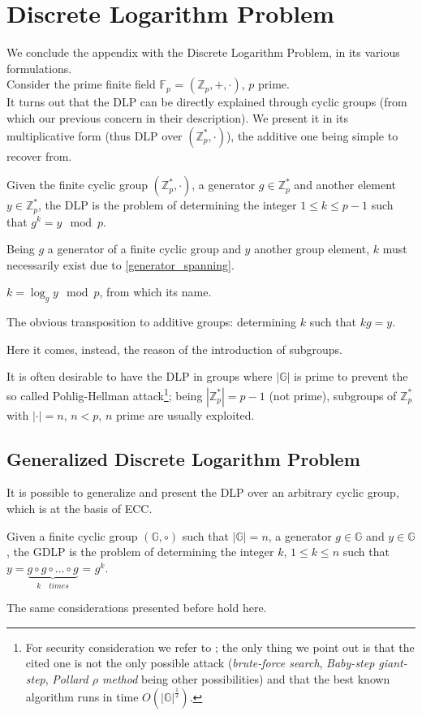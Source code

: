 \section{Discrete Logarithm Problem}
\label{DLP}
We conclude the appendix with the Discrete Logarithm Problem, in its various formulations.\\
Consider the prime finite field $\mathbb{F}_p$ = $(\mathbb{Z}_p,+,\cdot)$, $p$ prime.\\
It turns out that the DLP can be directly explained through cyclic groups (from which our previous concern in their description). We present it in its multiplicative form (thus DLP over $(\mathbb{Z}_p^{*},\cdot)$), the additive one being simple to recover from.
\begin{mydef}
    Given the finite cyclic group $(\mathbb{Z}_p^{*},\cdot)$, a generator $g \in \mathbb{Z}_p^{*}$ and another element $y \in \mathbb{Z}_p^{*}$, the DLP is the problem of determining the integer $1 \leq k \leq p-1$ such that $g^k = y \mod{p}$. 
\end{mydef}
\begin{myrem}
    Being $g$ a generator of a finite cyclic group and $y$ another group element, $k$ must necessarily exist due to \ref{generator_spanning}.
\end{myrem}
\begin{myrem}
    $k = \log_g{y} \mod{p}$, from which its name.
\end{myrem}
\begin{myrem}
    The obvious transposition to additive groups: determining $k$ such that $kg=y$.
\end{myrem}
\noindent
Here it comes, instead, the reason of the introduction of subgroups.
\begin{myrem}
    It is often desirable to have the DLP in groups where $|\mathbb{G}|$ is prime to prevent the so called Pohlig-Hellman attack\footnote{For security consideration we refer to \cite{UnderstandingCrypto}; the only thing we point out is that the cited one is not the only possible attack (\textit{brute-force search}, \textit{Baby-step giant-step}, \textit{Pollard $\rho$ method} being other possibilities) and that the best known algorithm runs in time $O(|\mathbb{G}|^{\frac{1}{2}})$.}; being $|\mathbb{Z}_p^{*}|=p-1$ (not prime), subgroups of  $\mathbb{Z}_p^{*}$ with $|\cdot|=n$, $n < p$, $n$ prime are usually exploited.
\end{myrem}
\subsection{Generalized Discrete Logarithm Problem}
It is possible to generalize and present the DLP over an arbitrary cyclic group, which is at the basis of ECC.
\begin{mydef}
    Given a finite cyclic group $(\mathbb{G},\circ)$ such that $|\mathbb{G}| = n$, a generator $g \in \mathbb{G}$ and $y \in \mathbb{G}$, the GDLP is the problem of determining the integer $k$, $1 \leq k \leq n$ such that $y = \underbrace{g \circ g \circ \dots \circ g}_{k \quad times}$ = $g^k$.
\end{mydef}
\begin{myrem}
    The same considerations presented before hold here.
\end{myrem}
